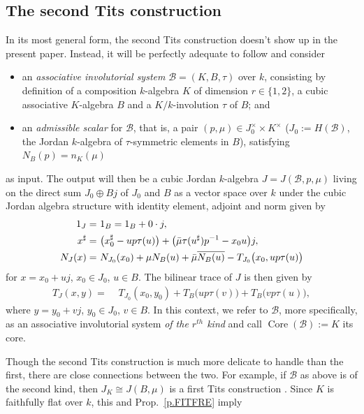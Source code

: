 \documentclass{amsart}
\theoremstyle{definition} %
\theoremstyle{remark} %
\newcommand{\msB}{\mathscr{B}}
\DeclareMathOperator{\Core}{Core}
\renewcommand{\:}{\colon\,}
\numberwithin{equation}{section}
\begin{document}
\subsection{The second Tits construction} \label{ss.SETICO} In its most general form, the second Tits construction doesn't show up in the present paper. Instead, it will be perfectly adequate to follow \cite[44.5]{MR4806163} and consider 
\begin{itemize}
\item an \emph{associative involutorial system} $\msB = (K,B,\tau)$
over $k$, consisting by definition of a composition $k$-algebra $K$ of dimension $r \in \{1,2\}$, a cubic associative $K$-algebra $B$ and a $K/k$-involution $\tau$ of $B$; and

\item an \emph{admissible scalar} for $\msB$, that is, a pair $(p,\mu) \in J_0^\times \times K^\times$ ($J_0 := H(\msB)$, the Jordan $k$-algebra of $\tau$-symmetric elements in $B$), satisfying $N_B(p) = n_K(\mu)$
\end{itemize}
as input. The output will then be a cubic Jordan $k$-algebra $J = J(\msB,p,\mu)$ living on the direct sum $J_0 \oplus Bj$ of $J_0$ and $B$ as a vector space over $k$ under the cubic Jordan algebra structure with identity element, adjoint and norm given by
\begin{align}
1_J =\,\,&1_B = 1_B + 0\cdot j, \notag \\
x^\sharp =\,\,&\big(x_0^\sharp - up\tau(u)\big) + \big(\bar\mu\tau(u^\sharp)p^{-1} - x_0u\big)j, \notag \\
\label{SETNOR} N_J(x) =\,\,&N_{J_0}(x_0) + \mu N_B(u) + \bar\mu\overline{N_B(u)} - T_{J_0}\big(x_0,up\tau(u)\big)
\end{align}
for $x = x_0 + uj$, $x_0 \in J_0$, $u \in B$. The bilinear trace of $J$ is then given by
\begin{align}
\label{SETBLT} T_J(x,y) =\,\,&T_{J_0}(x_0,y_0) + T_B\big(up\tau(v)\big) + T_B\big(vp\tau(u)\big),   
\end{align}
where $y = y_0 + vj$, $y_0 \in J_0$, $v \in B$. In this context, we refer to $\msB$, more specifically, as an associative involutorial system \emph{of the $r^{th}$ kind} and call $\Core(\msB) := K$ its core.

Though the second Tits construction is much more delicate to handle than the first, there are close connections between the two. For example, if $\msB$ as above is of the second kind, then $J_K \cong J(B,\mu)$ is a first Tits construction \cite[Cor.~44.20]{MR4806163}. Since $K$ is faithfully flat over $k$, this and Prop.~\ref{p.FITFRE} imply
\end{document}
